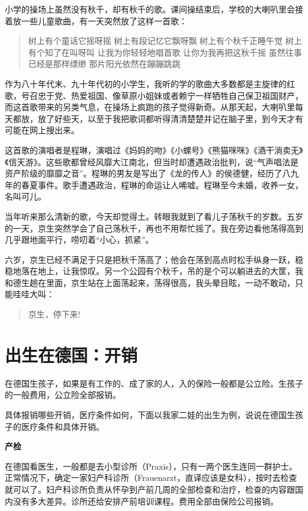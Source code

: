 \documentclass[twoside,openright,headings=optiontohead]{ctexbook} %
\begin{document}
{小学的操场上虽然没有秋千，却有秋千的歌。课间操结束后，学校的大喇叭里会接着放一些儿童歌曲，有一天突然放了这样一首歌：

\begin{quote}
树上有个童话它摇呀摇 树上有段记忆它飘呀飘 树上有个秋千正睡午觉
树上有个知了在叫呀叫 让我为你轻轻地唱首歌 让你为我再把这秋千摇
虽然往事已经是那样缥缈 那片阳光依然在蹦蹦跳跳
\end{quote}

作为八十年代末、九十年代初的小学生，我听的学的歌曲大多数都是主旋律的红歌，号召忠于党、热爱祖国、像草原小姐妹或者赖宁一样牺牲自己保卫祖国财产，而这首歌带来的另类气息，在操场上疯跑的孩子觉得新奇。从那天起，大喇叭里每天都放，放了好些天，以至于我把歌词都听得清清楚楚并记在脑子里，到今天才有可能在网上搜出来。

这首歌的演唱者是程琳，演唱过《妈妈的吻》《小螺号》《熊猫咪咪》《酒干淌卖无》《信天游》。这些歌都曾经风靡大江南北，但当时却遭遇政治批判，说``气声唱法是资产阶级的靡靡之音''。程琳的男友是写出了《龙的传人》的侯德健，经历了八九年的春夏事件。歌手遭遇政治，程琳的命运让人唏嘘。程琳至今未婚，收养一女，名叫可儿。

当年听来那么清新的歌，今天却觉得土。转眼我就到了看儿子荡秋千的岁数。五岁的一天，京生突然学会了自己荡秋千，再也不用帮忙摇了。我在旁边看他荡得高到几乎跟地面平行，唠叨着``小心，抓紧''。

六岁，京生已经不满足于只是把秋千荡高了；他会在荡到高点时松手纵身一跃，稳稳地落在地上，让我惊叹。另一个公园有个秋千，吊的是个可以躺进去的大筐，我和德生趟在里面，京生站在上面荡起来，荡得很高，我头晕目眩，一动不敢动，只能哇哇大叫：

\begin{quote}
京生，停下来!
\end{quote}

\chapter*{出生在德国：开销}\label{born-in-germany}

在德国生孩子，如果是有工作的、成了家的人，入的保险一般都是公立险。生孩子的一般费用，公立险全部报销。

具体报销哪些开销，医疗条件如何，下面以我家二娃的出生为例，说说在德国生孩子的医疗条件和具体开销。

\textbf{产检}

在德国看医生，一般都是去小型诊所（Praxis），只有一两个医生连同一群护士。正常情况下，确定一家妇产科诊所（Frauenarzt，直译应该是女科），按时去检查就可以了。妇产科诊所负责从怀孕到产前几周的全部检查和治疗，检查的内容跟国内没有多大差异。诊所还给安排产前培训课程。费用全部由保险公司报销。

}
\end{document}
